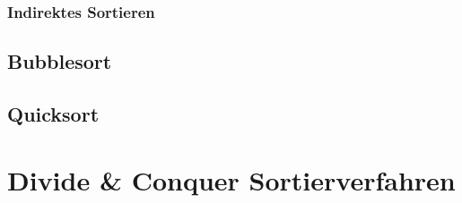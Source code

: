 \documentclass[12pt,a4paper]{article}
\begin{document}
\subsubsection{Indirektes Sortieren}

\subsection{Bubblesort}

\subsection{Quicksort}

\section{Divide \& Conquer Sortierverfahren}
\end{document}
